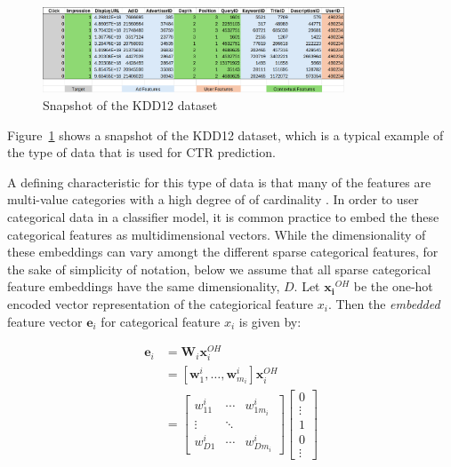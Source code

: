 \documentclass{mldsmsc}
\begin{document}
\begin{figure}[h]
\centering
\includegraphics[width=0.8\textwidth]{../figures/kdd12_snapshot.png}
\caption{Snapshot of the KDD12 dataset \cite{RefWorks:aden2012kdd}}
\label{fig:kdd12-snapshot}
\end{figure}

Figure~\ref{fig:kdd12-snapshot} shows a snapshot of the KDD12 dataset, which is a typical example of 
the type of data that is used for CTR prediction.

A defining characteristic for this type of data is that many of the features are multi-value categories with 
a high degree of of cardinality \citep{RefWorks:he2017neural}. In order to user categorical data
in a classifier model, it is common practice to embed the these categorical features
as multidimensional vectors. While the dimensionality of these embeddings can vary amongt the different
sparse categorical features, for the sake of simplicity of notation, below we assume that all sparse categorical feature
embeddings have the same dimensionality, $D$. Let $\mathbf{x_i}^{OH}$ be the one-hot encoded vector
representation of the categiorical feature $x_i$. Then the \emph{embedded} feature vector
$\mathbf{e}_i$ for categorical feature $x_i$ is given by:

\begin{equation}
\label{eqn:cat-embedding}
\begin{split}
\mathbf{e}_i &= \mathbf{W}_i \mathbf{x}_i^{OH}\\
&= \left[\mathbf{w}_{1}^{i}, \ldots, \mathbf{w}_{m_i}^{i} \right] \mathbf{x}_i^{OH} \\
&= \begin{bmatrix}
w_{11}^i & \cdots & w_{1 m_i}^i\\
\vdots & \ddots & \\
w_{D 1}^i & \cdots & w_{D m_i}^i
\end{bmatrix}
\begin{bmatrix}
    0 \\
    \vdots \\
    1 \\
    0\\
    \vdots
\end{bmatrix}
\end{split}
\end{equation}
\end{document}
